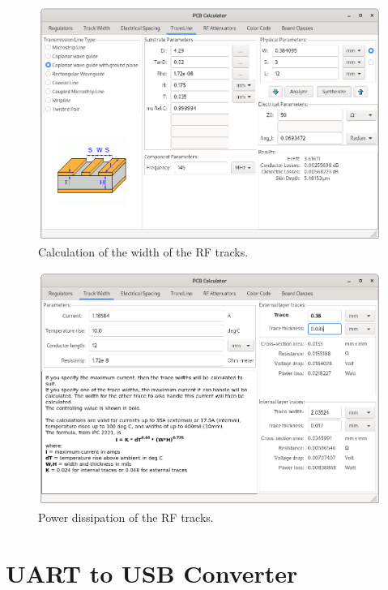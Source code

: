 \begin{figure}[!ht]
    \begin{center}
        \includegraphics[width=\textwidth]{figures/rf-track-width.png}
        \caption{Calculation of the width of the RF tracks.}
        \label{fig:rf-track-width-calc}
    \end{center}
\end{figure}

\begin{figure}[!ht]
    \begin{center}
        \includegraphics[width=\textwidth]{figures/rf-track-width-power.png}
        \caption{Power dissipation of the RF tracks.}
        \label{fig:rf-track-width-power-calc}
    \end{center}
\end{figure}

\section{UART to USB Converter}

